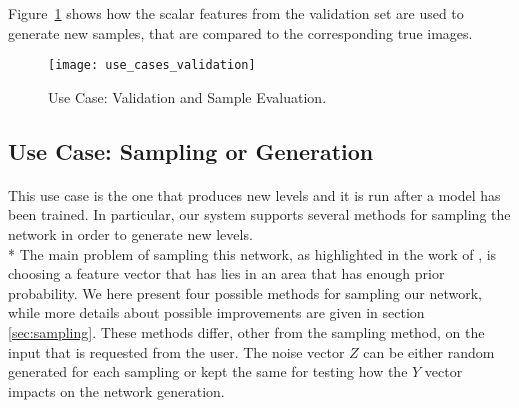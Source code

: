  Figure~\ref{fig:usecase_valid} shows how the scalar features from the validation set are used to generate new samples, that are compared to the corresponding true images.

\begin{figure}[h!]
	\begin{center}
		\texttt{[image: use\_cases\_validation]}
	\end{center}
	
	\captionsetup{width=\linewidth}
	\caption[Use Case: Validation and Sample Evaluation]{Use Case: Validation and Sample Evaluation.}
	\label{fig:usecase_valid}
\end{figure}

\subsection{Use Case: Sampling or Generation}
\label{sec:usecase_sampling}
\paragraph{} This use case is the one that produces new levels and it is run after a model has been trained. In particular, our system supports several methods for sampling the network in order to generate new levels. \\*
The main problem of sampling this network, as highlighted in the work of \citeauthor{slerp}\cite{slerp}, is choosing a feature vector that has lies in an area that has enough prior probability. We here present four possible methods for sampling our network, while more details about possible improvements are given in section \ref{sec:sampling}. These methods differ, other from the sampling method, on the input that is requested from the user. The noise vector $Z$ can be either random generated for each sampling or kept the same for testing how the $Y$ vector impacts on the network generation.

